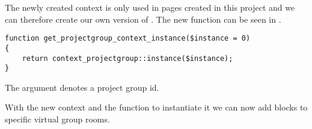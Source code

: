 The newly created context is only used in pages created in this project and we can therefore create our own version of . 
The new function can be seen in .
\begin{lstlisting}[style=phpCode, caption=\myCaption{The function to get projectgroup context}, label=src:codeprojectgroupcontextinstance]
function get_projectgroup_context_instance($instance = 0) 
{ 
    return context_projectgroup::instance($instance);
}
\end{lstlisting}

The  argument denotes a project group id.

With the new context and the function to instantiate it we can now add blocks to specific virtual group rooms. 